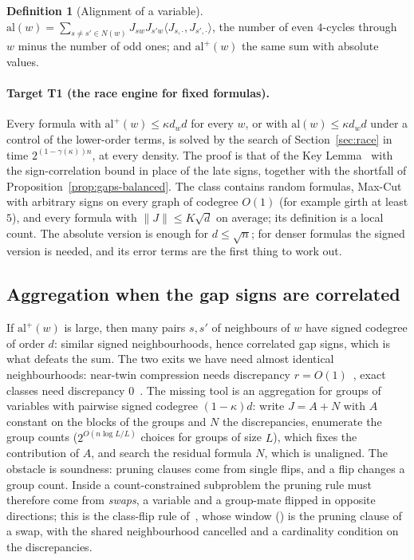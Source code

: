 \documentclass[11pt,a4paper]{article}
\theoremstyle{definition}
\newtheorem{definition}[theorem]{Definition}
\theoremstyle{remark}
\begin{document}
\begin{definition}[Alignment of a variable]
$\mathrm{al}(w)=\sum_{s\ne s'\in N(w)}J_{sw}J_{s'w}\langle J_{s,\cdot},J_{s',\cdot}\rangle$,
the number of even $4$-cycles through $w$ minus the number of odd ones; and
$\mathrm{al}^+(w)$ the same sum with absolute values.
\end{definition}

\paragraph{Target T1 (the race engine for fixed formulas).} Every formula with
$\mathrm{al}^+(w)\le\kappa d_wd$ for every $w$, or with
$\mathrm{al}(w)\le\kappa d_wd$ under a control of the lower-order terms, is
solved by the search of Section~\ref{sec:race} in time $2^{(1-\gamma(\kappa))n}$,
at every density. The proof is that of the Key Lemma~\cite{N8} with the
sign-correlation bound in place of the late signs, together with the
shortfall of Proposition~\ref{prop:gaps-balanced}. The class contains random
formulas, Max-Cut with arbitrary signs on every graph of codegree $O(1)$ (for
example girth at least $5$), and every formula with $\|J\|\le K\sqrt d$ on
average; its definition is a local count. The absolute version is enough for
$d\le\sqrt n$; for denser formulas the signed version is needed, and its
error terms are the first thing to work out.

\subsection{Aggregation when the gap signs are correlated}

If $\mathrm{al}^+(w)$ is large, then many pairs $s,s'$ of neighbours of $w$
have signed codegree of order $d$: similar signed neighbourhoods, hence
correlated gap signs, which is what defeats the sum. The two exits we have
need almost identical neighbourhoods: near-twin compression needs discrepancy
$r=O(1)$~\cite{NT}, exact classes need discrepancy $0$~\cite{N5}. The missing
tool is an aggregation for groups of variables with pairwise signed codegree
$(1-\kappa)d$: write $J=A+N$ with $A$ constant on the blocks of the groups and
$N$ the discrepancies, enumerate the group counts ($2^{O(n\log L/L)}$ choices
for groups of size $L$), which fixes the contribution of $A$, and search the
residual formula $N$, which is unaligned. The obstacle is soundness: pruning
clauses come from single flips, and a flip changes a group count. Inside a
count-constrained subproblem the pruning rule must therefore come from
\emph{swaps}, a variable and a group-mate flipped in opposite directions; this
is the class-flip rule of~\cite[Proposition~2]{N4}, whose window
(\cite[Proposition~1]{N4}) is the pruning clause of a swap, with the shared
neighbourhood cancelled and a cardinality condition on the discrepancies.
\end{document}
